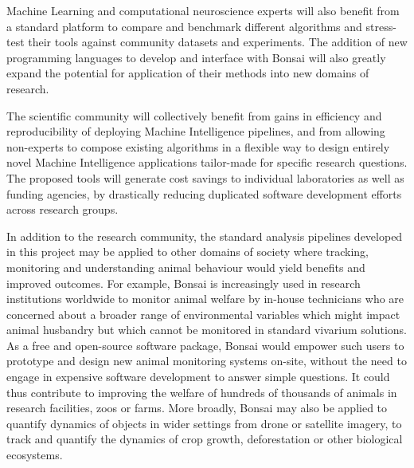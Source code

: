 Machine Learning and computational neuroscience experts will also benefit from a standard platform to compare and benchmark different algorithms and stress-test their tools against community datasets and experiments. The addition of new programming languages to develop and interface with Bonsai will also greatly expand the potential for application of their methods into new domains of research.

The scientific community will collectively benefit from gains in efficiency and reproducibility of deploying Machine Intelligence pipelines, and from allowing non-experts to compose existing algorithms in a flexible way to design entirely novel Machine Intelligence applications tailor-made for specific research questions. The proposed tools will generate cost savings to individual laboratories as well as funding agencies, by drastically reducing duplicated software development efforts across research groups.

In addition to the research community, the standard analysis pipelines developed in this project may be applied to other domains of society where tracking, monitoring and understanding animal behaviour would yield benefits and improved outcomes. For example, Bonsai is  increasingly used in research institutions worldwide to monitor animal welfare by in-house technicians who are concerned about a broader range of environmental variables which might impact animal husbandry but which cannot be monitored in standard vivarium solutions. As a free and open-source software package, Bonsai would empower such users to prototype and design new animal monitoring systems on-site, without the need to engage in expensive software development to answer simple questions. It could thus contribute to improving the welfare of hundreds of thousands of animals in research facilities, zoos or farms. More broadly, Bonsai may also be applied to quantify dynamics of objects in wider settings from drone or satellite imagery, to track and quantify the dynamics of crop growth, deforestation or other biological ecosystems.


